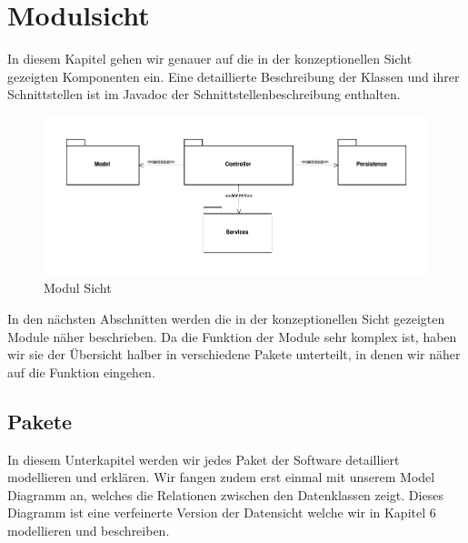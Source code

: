 \documentclass[enabledeprecatedfontcommands,fontsize=12pt,paper=a4,twoside]{scrartcl}
\begin{document}
\section{Modulsicht}

In diesem Kapitel gehen wir genauer auf die in der konzeptionellen Sicht gezeigten Komponenten ein. Eine detaillierte Beschreibung der Klassen und ihrer Schnittstellen ist im Javadoc der Schnittstellenbeschreibung enthalten.

\label{sec:modulsicht}
\begin{figure}[H]
\begin{center}
 \includegraphics[width=\textwidth]{UML/Modulsicht.png}
  \caption{Modul Sicht}
  \label{fig:boat1}
\end{center}
\end{figure}

In den nächsten Abschnitten werden die in der konzeptionellen Sicht gezeigten Module näher beschrieben. Da die Funktion der Module sehr komplex ist, haben wir sie der Übersicht halber in verschiedene Pakete unterteilt, in denen wir näher auf die Funktion eingehen.

\newpage
\subsection{Pakete}
In diesem Unterkapitel werden wir jedes Paket der Software detailliert modellieren und erklären.
Wir fangen zudem erst einmal mit unserem Model Diagramm an, welches die Relationen zwischen den Datenklassen zeigt. Dieses Diagramm ist eine verfeinerte Version der Datensicht welche wir in Kapitel 6 modellieren und beschreiben. 
\end{document}
